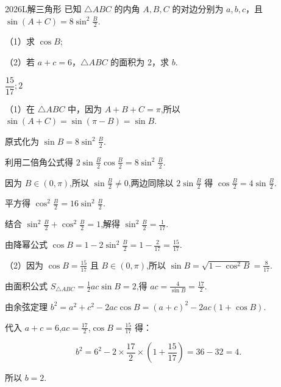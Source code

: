 
\begin{problem}{2026}{L}{}{}{解三角形}
已知 $\triangle ABC$ 的内角 $A, B, C$ 的对边分别为 $a, b, c$，且 $\sin(A+C)=8\sin^2\frac{B}{2}$.

（1）求 $\cos B$;

（2）若 $a+c=6$，$\triangle ABC$ 的面积为 2，求 $b$.
\end{problem}

\begin{answer}
$\displaystyle\dfrac{15}{17}; 2$
\end{answer}

\begin{solutions}
（1）在 $\triangle ABC$ 中，因为 $A+B+C=\pi$,所以 $\sin(A+C)=\sin(\pi-B)=\sin B$.

原式化为 $\sin B=8\sin^2\frac{B}{2}$.

利用二倍角公式得 $2\sin\frac{B}{2}\cos\frac{B}{2}=8\sin^2\frac{B}{2}$.

因为 $B\in(0,\pi)$,所以 $\sin\frac{B}{2}\neq 0$,两边同除以 $2\sin\frac{B}{2}$ 得 $\cos\frac{B}{2}=4\sin\frac{B}{2}$.

平方得 $\cos^2\frac{B}{2}=16\sin^2\frac{B}{2}$.

结合 $\sin^2\frac{B}{2}+\cos^2\frac{B}{2}=1$,解得 $\sin^2\frac{B}{2}=\displaystyle\frac{1}{17}$.

由降幂公式 $\cos B=1-2\sin^2\frac{B}{2}=1-\displaystyle\frac{2}{17}=\displaystyle\frac{15}{17}$.

（2）因为 $\cos B=\displaystyle\frac{15}{17}$ 且 $B\in(0,\pi)$,所以 $\sin B=\sqrt{1-\cos^2 B}=\displaystyle\frac{8}{17}$.

由面积公式 $S_{\triangle ABC}=\displaystyle\frac{1}{2}ac\sin B=2$,得 $ac=\displaystyle\frac{4}{\sin B}=\displaystyle\frac{17}{2}$.

由余弦定理 $b^2=a^2+c^2-2ac\cos B=(a+c)^2-2ac(1+\cos B)$.

代入 $a+c=6$,$ac=\displaystyle\frac{17}{2}$,$\cos B=\displaystyle\frac{15}{17}$ 得：

$$
b^2=6^2-2\times\displaystyle\frac{17}{2}\times\left(1+\displaystyle\frac{15}{17}\right)=36-32=4.
$$

所以 $b=\boxed{2}$.
\end{solutions}